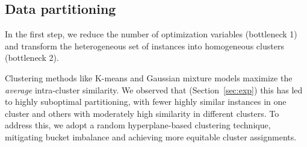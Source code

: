 \documentclass[letterpaper]{article}
\begin{document}


\subsection{Data partitioning}
In the first step, we reduce the number of optimization variables (bottleneck 1) and transform the heterogeneous set of instances into homogeneous clusters (bottleneck 2).

Clustering methods like K-means and Gaussian mixture models maximize the \emph{average} intra-cluster similarity. We observed that (Section~\ref{sec:exp}) this has led to highly suboptimal partitioning, with fewer highly similar instances in one cluster and others with moderately high similarity in different clusters. To address this, we adopt a random hyperplane-based clustering technique, mitigating bucket imbalance and achieving more equitable cluster assignments.
\end{document}
